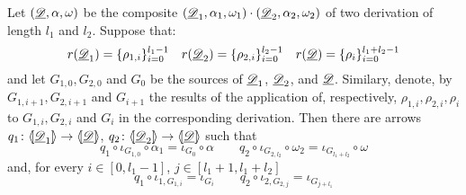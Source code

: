 \begin{lemma}\label{rem:dett}
	Let $(\underline{\mathscr{D}}, \alpha, \omega)$ be the composite $(\underline{\mathscr{D}}_1, \alpha_1, \omega_1)\cdot (\underline{\mathscr{D}}_2, \alpha_2, \omega_2)$ of two derivation of length $l_1$ and $l_2$. Suppose that:
\[r(\underline{\mathscr{D}}_1)=\{\rho_{1,i}\}_{i=0}^{l_1-1} \quad r(\underline{\mathscr{D}}_2)=\{\rho_{2,i}\}_{i=0}^{l_2-1} \quad  r(\underline{\mathscr{D}})=\{\rho_{i}\}_{i=0}^{l_1+l_2-1}\]
and let  $G_{1,0}, G_{2,0}$ and $G_{0}$ be the sources of $\underline{\mathscr{D}}_1$, $\underline{\mathscr{D}}_2$,  and $\underline{\mathscr{D}}$. Similary, denote, by $G_{1,i+1}, G_{2,i+1}$ and $G_{i+1}$ the results of the application of, respectively, $\rho_{1,i}, \rho_{2,i}, \rho_i$ to $G_{1,i}, G_{2,i}$ and $G_{i}$  in the corresponding derivation. Then there are arrows $q_1\colon \langle \hspace{-1.85pt}[ \underline{\mathscr{D}}_1]\hspace{-1.85pt}\rangle \to \langle \hspace{-1.85pt}[ \underline{\mathscr{D}}]\hspace{-1.85pt}\rangle$, $q_2\colon \langle \hspace{-1.85pt}[ \underline{\mathscr{D}}_2]\hspace{-1.85pt}\rangle \to \langle \hspace{-1.85pt}[ \underline{\mathscr{D}}]\hspace{-1.85pt}\rangle$ such that
\[q_1\circ \iota_{G_{1,0}}\circ \alpha_1 = \iota_{G_{0}}\circ \alpha \qquad q_2\circ \iota_{G_{2,l_2}}\circ \omega_2 = \iota_{G_{l_1+l_2}}\circ \omega \]
and, for every $i\in [0, l_1-1]$, $j\in [l_1+1, l_1+l_2]$
	\[q_1\circ \iota_{1, G_{1,i}}=\iota_{G_{i}}\qquad q_2\circ \iota_{2, G_{2,j}}=\iota_{G_{j+l_1}} \]
\end{lemma}
